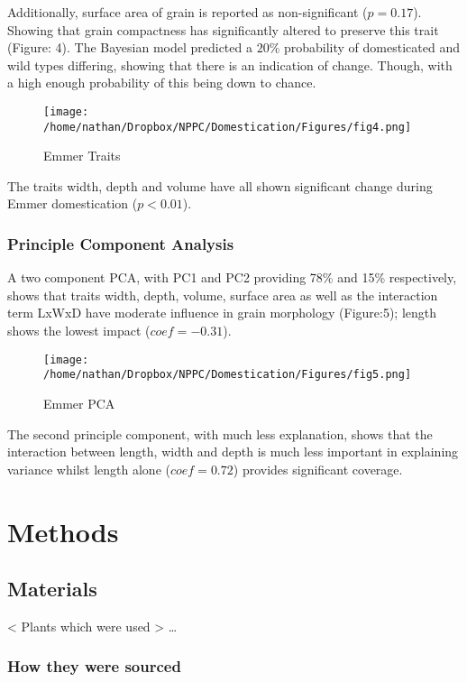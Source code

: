 \documentclass[a4paper, twocolumn]{article}
\begin{document}
Additionally, surface area of grain is reported as non-significant (\(p=0.17\)). Showing that grain compactness has significantly altered to preserve this trait (Figure: 4). The Bayesian model predicted a \(20\%\) probability of domesticated and wild types differing, showing that there is an indication of change. Though, with a high enough probability of this being down to chance.

\begin{figure}[htbp]
\centering
\texttt{[image: /home/nathan/Dropbox/NPPC/Domestication/Figures/fig4.png]}
\caption{\label{fig:org4801f4f}
Emmer Traits}
\end{figure}

The traits width, depth and volume have all shown significant change during Emmer domestication (\(p<0.01\)).

\subsubsection{Principle Component Analysis}
\label{sec:orge1ebce5}

A two component PCA, with PC1 and PC2 providing 78\% and 15\% respectively, shows that traits width, depth, volume, surface area as well as the interaction term LxWxD have moderate influence in grain morphology (Figure:5); length shows the lowest impact (\(coef = -0.31\)).

\begin{figure}[htbp]
\centering
\texttt{[image: /home/nathan/Dropbox/NPPC/Domestication/Figures/fig5.png]}
\caption{\label{fig:org6063a7c}
Emmer PCA}
\end{figure}

The second principle component, with much less explanation, shows that the interaction between length, width and depth is much less important in explaining variance whilst length alone (\(coef=0.72\)) provides significant coverage.


\section{Methods}
\label{sec:orgaf07f43}
\subsection{Materials}
\label{sec:orgdb9a6e0}
< Plants which were used > \ldots{}
\subsubsection{How they were sourced}
\label{sec:org5f59b67}
\end{document}
